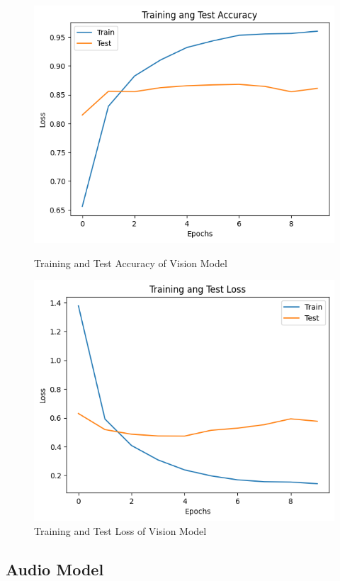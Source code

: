 \documentclass[fleqn, 10pt, twoside]{IOEGC}
\begin{document}
\begin{figure}[h]
	\centering
	\includegraphics[scale=0.65]{Graphics/accuracy_vision_model.png}
	\caption{Training and Test Accuracy of Vision Model}
	\includegraphics[scale=0.65]{Graphics/loss_vision.png}
	\caption{Training and Test Loss of Vision Model}
	\label{fig:enter-label}
\end{figure}












\subsection{Audio Model}
\end{document}

